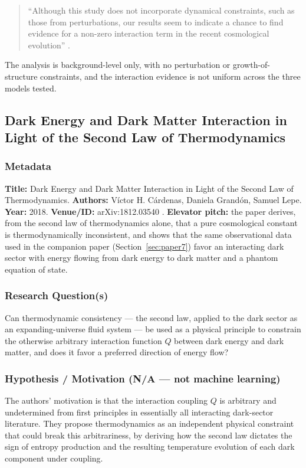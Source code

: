 \documentclass[11pt]{article}
\begin{document}
\begin{quote}
\enquote{Although this study does not incorporate dynamical constraints, such as those from perturbations, our results seem to indicate a chance to find evidence for a non-zero interaction term in the recent cosmological evolution} \citep[p.~14]{grandon2018evidence}.
\end{quote}

\noindent The analysis is background-level only, with no perturbation or growth-of-structure constraints, and the interaction evidence is not uniform across the three models tested.

\subsection{Dark Energy and Dark Matter Interaction in Light of the Second Law of Thermodynamics}
\label{sec:paper8}

\subsubsection{Metadata}
\textbf{Title:} Dark Energy and Dark Matter Interaction in Light of the Second Law of Thermodynamics. \textbf{Authors:} Víctor H. Cárdenas, Daniela Grandón, Samuel Lepe. \textbf{Year:} 2018. \textbf{Venue/ID:} arXiv:1812.03540 \citep{cardenas2018thermodynamics}. \textbf{Elevator pitch:} the paper derives, from the second law of thermodynamics alone, that a pure cosmological constant is thermodynamically inconsistent, and shows that the same observational data used in the companion paper (Section~\ref{sec:paper7}) favor an interacting dark sector with energy flowing from dark energy to dark matter and a phantom equation of state.

\subsubsection{Research Question(s)}
Can thermodynamic consistency — the second law, applied to the dark sector as an expanding-universe fluid system — be used as a physical principle to constrain the otherwise arbitrary interaction function $Q$ between dark energy and dark matter, and does it favor a preferred direction of energy flow?

\subsubsection{Hypothesis / Motivation (N/A --- not machine learning)}
The authors' motivation is that the interaction coupling $Q$ is arbitrary and undetermined from first principles in essentially all interacting dark-sector literature. They propose thermodynamics as an independent physical constraint that could break this arbitrariness, by deriving how the second law dictates the sign of entropy production and the resulting temperature evolution of each dark component under coupling.
\end{document}
